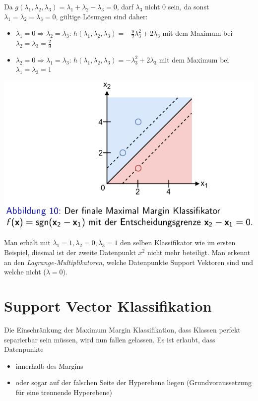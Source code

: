 \documentclass{report}
\begin{document}
Da $g(\lambda_1, \lambda_2, \lambda_3) = \lambda_1 + \lambda_2 - \lambda_3 = 0$, darf $\lambda_3$ nicht $0$ sein, da sonst
$\lambda_1 = \lambda_2 = \lambda_3 = 0$, gültige Lösungen sind daher:\\
\vspace*{-1.5em}
\begin{itemize}
  \item $\lambda_1 = 0 \Rightarrow \lambda_2 = \lambda_3$: $h(\lambda_1, \lambda_2, \lambda_3) = -\frac{9}{2}\lambda_3^2 + 2\lambda_3$
  mit dem Maximum bei $\lambda_2 = \lambda_3 = \frac{2}{9}$
  \item $\lambda_2 = 0 \Rightarrow \lambda_1 = \lambda_3$: $h(\lambda_1, \lambda_2, \lambda_3) = -\lambda_3^2 + 2\lambda_3$
  mit dem Maximum bei $\lambda_1 = \lambda_3 = 1$
\end{itemize}

\begin{center}
  \includegraphics[scale=.275]{ml06_10}
\end{center}

Man erhält mit $\lambda_1 =1, \lambda_2=0, \lambda_3=1$ den selben Klassifikator wie im ersten Beispiel, diesmal ist
der zweite Datenpunkt $x^2$ nicht mehr beteiligt. Man erkennt an den \textit{Lagrange-Multiplikatoren}, welche
Datenpunkte Support Vektoren sind und welche nicht ($\lambda = 0$).

\section{Support Vector Klassifikation}

Die Einschränkung der Maximum Margin Klassifikation, dass Klassen perfekt separierbar sein müssen, wird nun fallen gelassen.
Es ist erlaubt, dass Datenpunkte\\
\vspace*{-1.5em}
\begin{itemize}
  \item innerhalb des Margins
  \item oder sogar auf der falschen Seite der Hyperebene liegen (Grundvoraussetzung für eine trennende Hyperebene)
\end{itemize}
\end{document}
